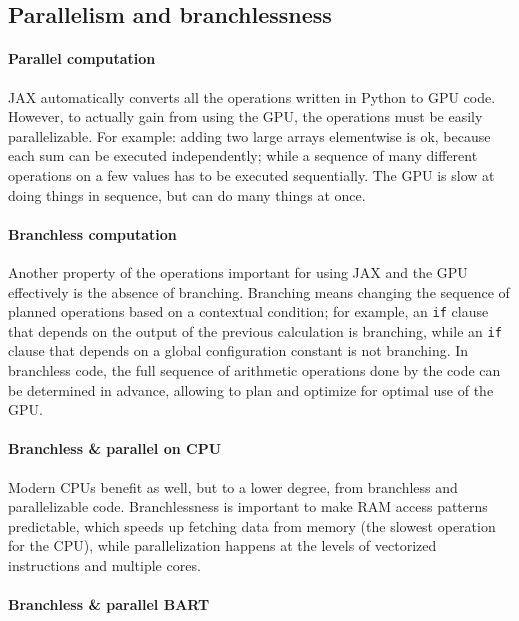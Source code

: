 \documentclass{article}
\begin{document}
    \subsection{Parallelism and branchlessness}

    \paragraph{Parallel computation}

    JAX automatically converts all the operations written in Python to GPU code. However, to actually gain from using the GPU, the operations must be easily parallelizable. For example: adding two large arrays elementwise is ok, because each sum can be executed independently; while a sequence of many different operations on a few values has to be executed sequentially. The GPU is slow at doing things in sequence, but can do many things at once.

    \paragraph{Branchless computation}

    Another property of the operations important for using JAX and the GPU effectively is the absence of branching. Branching means changing the sequence of planned operations based on a contextual condition; for example, an \texttt{if} clause that depends on the output of the previous calculation is branching, while an \texttt{if} clause that depends on a global configuration constant is not branching. In branchless code, the full sequence of arithmetic operations done by the code can be determined in advance, allowing to plan and optimize for optimal use of the GPU.

    \paragraph{Branchless \& parallel on CPU}

    Modern CPUs benefit as well, but to a lower degree, from branchless and parallelizable code. Branchlessness is important to make RAM access patterns predictable, which speeds up fetching data from memory (the slowest operation for the CPU), while parallelization happens at the levels of vectorized instructions and multiple cores.

    \paragraph{Branchless \& parallel BART}
\end{document}
